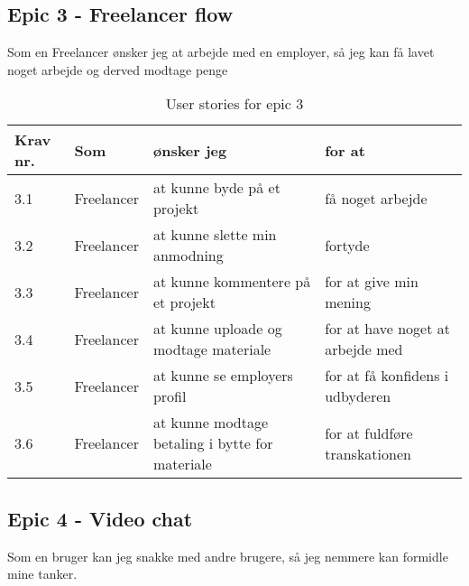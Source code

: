 \subsection{Epic 3 - Freelancer flow}

Som en Freelancer ønsker jeg at arbejde med en employer, så jeg kan få lavet noget arbejde og derved modtage penge

\begin{table}[H]
    \centering
    \caption{User stories for epic 3}
    \label{tab:us-epic3}
    \begin{tabular}{l|l|l|l}
        \textbf{Krav nr.} & \textbf{Som} & \textbf{ønsker jeg}                             & \textbf{for at}                  \\
        \hline
        3.1               & Freelancer   & at kunne byde på et projekt                     & få noget arbejde                 \\
        \hline
        3.2               & Freelancer   & at kunne slette min anmodning                   & fortyde                          \\
        \hline
        3.3               & Freelancer   & at kunne kommentere på et projekt               & for at give min mening           \\
        \hline
        3.4               & Freelancer   & at kunne uploade og modtage materiale           & for at have noget at arbejde med \\
        \hline
        3.5               & Freelancer   & at kunne se employers profil                    & for at få konfidens i udbyderen  \\
        \hline
        3.6               & Freelancer   & at kunne modtage betaling i bytte for materiale & for at fuldføre transkationen    \\
    \end{tabular}
\end{table}

\subsection{Epic 4 - Video chat}

Som en bruger kan jeg snakke med andre brugere, så jeg nemmere kan formidle mine tanker.

